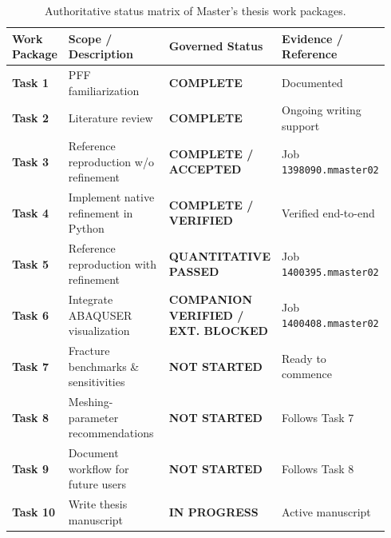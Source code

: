 \begin{table}[htbp]
\centering
\caption{Authoritative status matrix of Master's thesis work packages.}
\label{tab:thesis_task_status}
\small
\begin{tabularx}{\linewidth}{p{0.14\linewidth}p{0.36\linewidth}p{0.24\linewidth}p{0.20\linewidth}}
\toprule
\textbf{Work Package} & \textbf{Scope / Description} & \textbf{Governed Status} & \textbf{Evidence / Reference} \\
\midrule
\textbf{Task 1} & PFF familiarization & \textbf{COMPLETE} & Documented \\
\textbf{Task 2} & Literature review & \textbf{COMPLETE} & Ongoing writing support \\
\textbf{Task 3} & Reference reproduction w/o refinement & \textbf{COMPLETE / ACCEPTED} & Job \texttt{1398090.mmaster02} \\
\textbf{Task 4} & Implement native refinement in Python & \textbf{COMPLETE / VERIFIED} & Verified end-to-end \\
\textbf{Task 5} & Reference reproduction with refinement & \textbf{QUANTITATIVE PASSED} & Job \texttt{1400395.mmaster02} \\
\textbf{Task 6} & Integrate ABAQUSER visualization & \textbf{COMPANION VERIFIED / EXT. BLOCKED} & Job \texttt{1400408.mmaster02} \\
\textbf{Task 7} & Fracture benchmarks \& sensitivities & \textbf{NOT STARTED} & Ready to commence \\
\textbf{Task 8} & Meshing-parameter recommendations & \textbf{NOT STARTED} & Follows Task 7 \\
\textbf{Task 9} & Document workflow for future users & \textbf{NOT STARTED} & Follows Task 8 \\
\textbf{Task 10} & Write thesis manuscript & \textbf{IN PROGRESS} & Active manuscript \\
\bottomrule
\end{tabularx}
\end{table}

